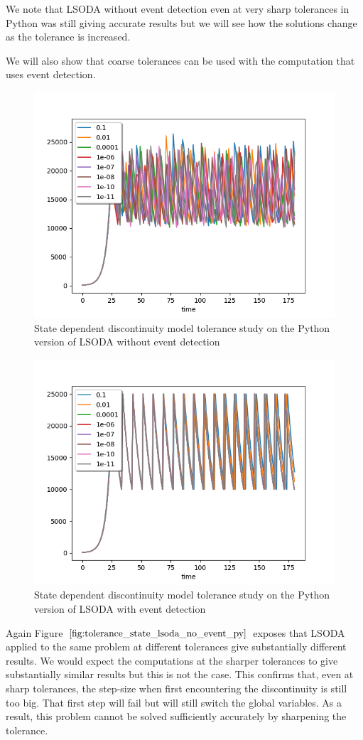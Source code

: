We note that LSODA without event detection even at very sharp tolerances in Python was still giving accurate results but we will see how the solutions change as the tolerance is increased. 

We will also show that coarse tolerances can be used with the computation that uses event detection. 

\begin{figure}[h]
\centering
\includegraphics[width=0.7\linewidth]{./figures/tolerance_state_lsoda_no_event_py}
\caption{State dependent discontinuity model tolerance study on the Python version of LSODA without event detection}
\label{fig:tolerance_state_lsoda_no_event_py}
\end{figure}

\begin{figure}[h]
\centering
\includegraphics[width=0.7\linewidth]{./figures/tolerance_state_lsoda_with_event_py}
\caption{State dependent discontinuity model tolerance study on the Python version of LSODA with event detection}
\label{fig:tolerance_state_lsoda_with_event_py}
\end{figure}

Again Figure $\ref{fig:tolerance_state_lsoda_no_event_py}$ exposes that LSODA applied to the same problem at different tolerances give substantially different results. We would expect the computations at the sharper tolerances to give substantially similar results but this is not the case. This confirms that, even at sharp tolerances, the step-size when first encountering the discontinuity is still too big. That first step will fail but will still switch the global variables. As a result, this problem cannot be solved sufficiently accurately by sharpening the tolerance.

